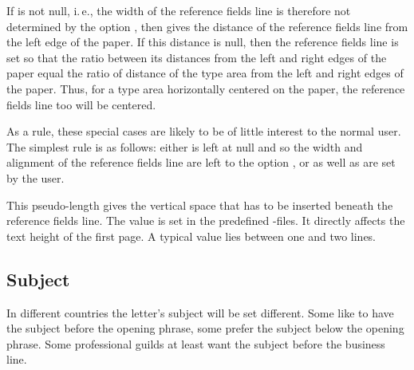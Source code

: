 If  is not null, i.\,e., the width of the reference fields
line is therefore not determined by the option , then
 gives the distance of the reference fields line from the
left edge of the paper. If this distance is null, then
the reference fields line is set so that the ratio between its distances from
the left and right edges of the paper equal the ratio of distance of the type
area from the left and right edges of the paper. Thus, for a type area
horizontally centered on the paper, the reference fields line too will be
centered.

As a rule, these special cases are likely to be of little interest to the
normal user. The simplest rule is as follows: either
 is left at null and so the width and alignment of the
reference fields line are left to the option , or
 as well as  are set by the user.%
%
\EndIndexGroup


\begin{Declaration}
\end{Declaration}
This pseudo-length gives the vertical space that has to be inserted beneath
the reference fields line. The value is set in the predefined
-files. It
directly affects the text height of the first page. A typical value lies
between one and two lines.%
%
\EndIndexGroup
%
\EndIndexGroup


\subsection{Subject}
%
\BeginIndexGroup
{}

In different countries the letter's subject will be set different. Some like
to have the subject before the opening phrase, some prefer the subject below
the opening phrase. Some professional guilds at least want the subject before
the business line.

